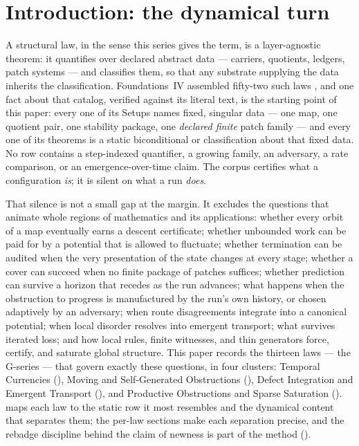 \documentclass[11pt]{article}
\newcommand{\clusterA}{Temporal Currencies}
\newcommand{\clusterB}{Moving and Self-Generated Obstructions}
\newcommand{\clusterC}{Defect Integration and Emergent Transport}
\newcommand{\clusterD}{Productive Obstructions and Sparse Saturation}
\newcommand{\FoundIV}{Foundations~IV}
\theoremstyle{definition}
\begin{document}
\section{Introduction: the dynamical turn}\label{sec:intro}

A structural law, in the sense this series gives the term, is a layer-agnostic theorem: it quantifies
over declared abstract data --- carriers, quotients, ledgers, patch systems --- and classifies them,
so that any substrate supplying the data inherits the classification. \FoundIV{} assembled fifty-two
such laws \citep{Tsiokos2026FoundIV}, and one fact about that catalog, verified against its literal
text, is the starting point of this paper: every one of its Setups names fixed, singular data ---
one map, one quotient pair, one stability package, one \emph{declared finite} patch family --- and
every one of its theorems is a static biconditional or classification about that fixed data. No row
contains a step-indexed quantifier, a growing family, an adversary, a rate comparison, or an
emergence-over-time claim. The corpus certifies what a configuration \emph{is}; it is silent on what
a run \emph{does}.

That silence is not a small gap at the margin. It excludes the questions that animate whole regions
of mathematics and its applications: whether every orbit of a map eventually earns a descent
certificate; whether unbounded work can be paid for by a potential that is allowed to fluctuate;
whether termination can be audited when the very presentation of the state changes at every stage;
whether a cover can succeed when no finite package of patches suffices; whether prediction can
survive a horizon that recedes as the run advances; what happens when the obstruction to progress is
manufactured by the run's own history, or chosen adaptively by an adversary; when route disagreements
integrate into a canonical potential; when local disorder resolves into emergent transport; what
survives iterated loss; and how local rules, finite witnesses, and thin generators force, certify,
and saturate global structure. This paper records the thirteen laws --- the G-series --- that govern
exactly these questions, in four clusters: \clusterA{} (), \clusterB{}
(), \clusterC{} (), and \clusterD{} ().
 maps each law to the static row it most resembles and the dynamical content
that separates them; the per-law sections make each separation precise, and the rebadge discipline
behind the claim of newness is part of the method ().
\end{document}
